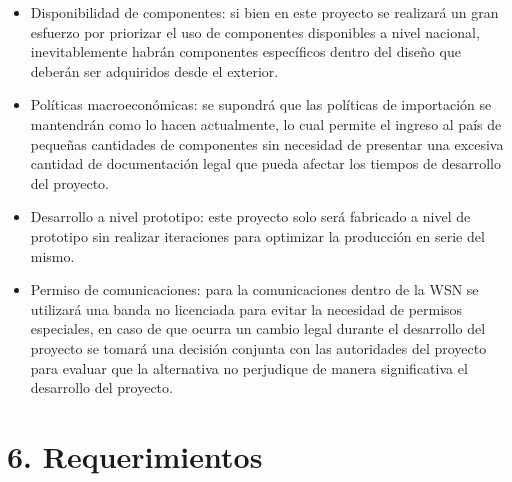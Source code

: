 \documentclass[
11pt, %
codirector, %
]{charter}
\begin{document}
\begin{itemize}
\item Disponibilidad de componentes: si bien en este proyecto se realizará un gran esfuerzo por priorizar el uso de componentes disponibles a nivel nacional, inevitablemente habrán componentes específicos dentro del diseño que deberán ser adquiridos desde el exterior.
\item Políticas macroeconómicas: se supondrá que las políticas de importación se mantendrán como lo hacen actualmente, lo cual permite el ingreso al país de pequeñas cantidades de componentes sin necesidad de presentar una excesiva cantidad de documentación legal que pueda afectar los tiempos de desarrollo del proyecto.
\item Desarrollo a nivel prototipo: este proyecto solo será fabricado a nivel de prototipo sin realizar iteraciones para optimizar la producción en serie del mismo.
\item Permiso de comunicaciones: para la comunicaciones dentro de la WSN se utilizará una banda no licenciada para evitar la necesidad de permisos especiales, en caso de que ocurra un cambio legal durante el desarrollo del proyecto se tomará una decisión conjunta con las autoridades del proyecto para evaluar que la alternativa no perjudique de manera significativa el desarrollo del proyecto.
\end{itemize}

\section{6. Requerimientos}
\label{sec:requerimientos}
\end{document}
